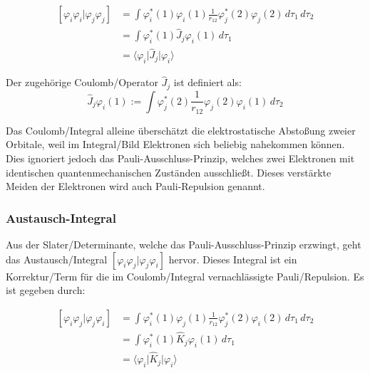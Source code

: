 \begin{equation}\label{coulomb}
\begin{aligned}
  \left[ \varphi_i \varphi_i \vert \varphi_j \varphi_j \right] &= 
  \int \varphi_i^*(1) \varphi_i(1) \frac{1}{r_{12}} \varphi_j^*(2) \varphi_j(2) \,d\tau_1 \,d\tau_2\\
  &= \int \varphi_i^*(1) \hat{J}_j \varphi_i(1) \,d\tau_1 \\ 
  &= \langle \varphi_i \vert \hat{J}_j \vert \varphi_i \rangle
\end{aligned}
\end{equation}

Der zugehörige Coulomb\-/Operator $\hat{J}_j$ ist definiert als:
\begin{equation}
  \hat{J}_j \varphi_i(1):= 
  \int \varphi_j^*(2) \frac{1}{r_{12}} \varphi_j(2) \varphi_i(1) \,d\tau_2 
\end{equation}

Das Coulomb\-/Integral alleine überschätzt die elektrostatische Abstoßung zweier Orbitale,
weil im Integral\-/Bild Elektronen sich beliebig nahekommen können.
Dies ignoriert jedoch das Pauli-Ausschluss-Prinzip, 
welches zwei Elektronen mit identischen quantenmechanischen Zuständen ausschließt.
Dieses verstärkte Meiden der Elektronen wird auch Pauli-Repulsion genannt.

\cite[S. 206]{lewars_2016} \cite[S. 23]{tc2_3}

\subsubsection*{Austausch-Integral}
Aus der Slater\-/Determinante, welche das Pauli-Ausschluss-Prinzip erzwingt,
geht das Austausch\-/Integral $\left[ \varphi_i \varphi_j \vert \varphi_j\varphi_i \right]$ hervor.
Dieses Integral ist ein Korrektur\-/Term für die im Coulomb\-/Integral vernachlässigte Pauli\-/Repulsion.
Es ist gegeben durch:


\begin{equation}\label{exchange}
  \begin{aligned}
  \left[ \varphi_i \varphi_j \vert \varphi_j \varphi_i \right] &= 
  \int \varphi_i^*(1) \varphi_j(1) \frac{1}{r_{12}} \varphi_j^*(2) \varphi_i(2) \,d\tau_1 \,d\tau_2\\
  &= \int \varphi_i^*(1) \hat{K}_j \varphi_i(1) \,d\tau_1 \\ 
  &= \langle \varphi_i \vert \hat{K}_j \vert \varphi_i \rangle
\end{aligned}
\end{equation}

